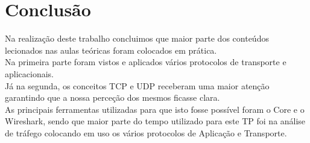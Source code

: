 \documentclass[a4paper]{report}
\begin{document}
\chapter{Conclusão}
Na realização deste trabalho concluimos que maior parte dos conteúdos lecionados
nas aulas teóricas foram colocados em prática.\\
Na primeira parte foram vistos e aplicados vários protocolos de transporte e
aplicacionais.\\
Já na segunda, os conceitos TCP e UDP receberam uma maior atenção garantindo que
a nossa perceção dos mesmos ficasse clara.\\
As principais ferramentas utilizadas para que isto fosse possível foram o Core e
o Wireshark, sendo que maior parte do tempo utilizado para este TP foi na
análise de tráfego colocando em uso os vários protocolos de Aplicação e
Transporte.
\end{document}
